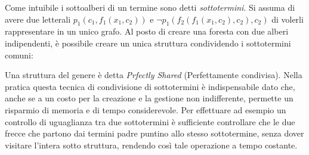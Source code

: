 \documentclass[./main.tex]{subfiles}
\begin{document}
\begin{center}
\end{center}

Come intuibile i sottoalberi di un termine sono detti \textit{sottotermini}. Si assuma di avere due letterali $p_1(c_1, f_1(x_1, c_2))$ e 
$\lnot p_1(f_2(f_1(x_1, c_2), c_2), c_2)$ di volerli rappresentare in un unico grafo. Al posto di creare una foresta con due alberi indipendenti,
è possibile creare un unica struttura condividendo i sottotermini comuni:

\begin{center}
\end{center}

Una struttura del genere è detta \textit{Prfectly Shared} (Perfettamente condivisa). Nella pratica questa
tecnica di condivisione di sottotermini è indispensabile dato che,
anche se a un costo per la creazione e la gestione non indifferente,
permette un risparmio di memoria e di tempo considerevole. Per effettuare ad esempio un controllo 
di uguaglianza tra due sottotermini è sufficiente controllare che le due frecce che partono dai termini padre
puntino allo stesso sottotermine, senza dover visitare l'intera sotto struttura, rendendo così tale operazione a tempo costante.
\end{document}
